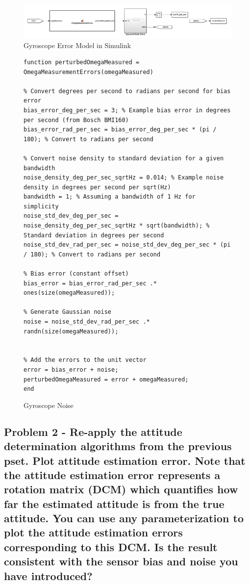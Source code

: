\begin{figure}[H]
    \centering
    \captionsetup{ justification = centering }
    \includegraphics[width = 15cm]{Images/PS7/GyroErrorSimulink.png}
    \caption{Gyroscope Error Model in Simulink}
    \label{fig:gyroErrorSimulink}
\end{figure}

\begin{figure} [H]
    \centering
    \begin{lstlisting}
function perturbedOmegaMeasured = OmegaMeasurementErrors(omegaMeasured)

% Convert degrees per second to radians per second for bias error
bias_error_deg_per_sec = 3; % Example bias error in degrees per second (from Bosch BMI160)
bias_error_rad_per_sec = bias_error_deg_per_sec * (pi / 180); % Convert to radians per second

% Convert noise density to standard deviation for a given bandwidth
noise_density_deg_per_sec_sqrtHz = 0.014; % Example noise density in degrees per second per sqrt(Hz)
bandwidth = 1; % Assuming a bandwidth of 1 Hz for simplicity
noise_std_dev_deg_per_sec = noise_density_deg_per_sec_sqrtHz * sqrt(bandwidth); % Standard deviation in degrees per second
noise_std_dev_rad_per_sec = noise_std_dev_deg_per_sec * (pi / 180); % Convert to radians per second

% Bias error (constant offset)
bias_error = bias_error_rad_per_sec .* ones(size(omegaMeasured));

% Generate Gaussian noise
noise = noise_std_dev_rad_per_sec .* randn(size(omegaMeasured));


% Add the errors to the unit vector
error = bias_error + noise;
perturbedOmegaMeasured = error + omegaMeasured;
end
    \end{lstlisting}
    \caption{Gyroscope Noise}
    \label{fig:gyroNoise}
\end{figure}

\subsection{Problem 2 - Re-apply the attitude determination algorithms from the previous pset. Plot attitude estimation error. Note that the attitude estimation error represents a rotation matrix (DCM) which quantifies how far the estimated
attitude is from the true attitude. You can use any parameterization to plot the attitude estimation errors corresponding to this DCM. Is the result consistent with the sensor bias and noise you have introduced?}

